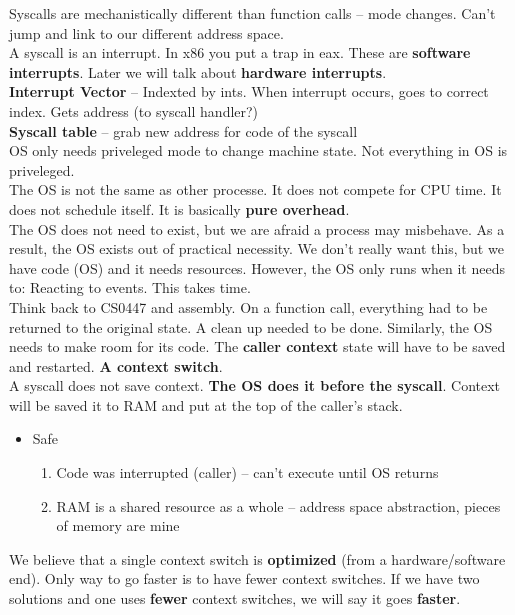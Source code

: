 \documentclass[../base_file/cs1550_notes.tex]{subfiles}
\begin{document}
Syscalls are mechanistically different than function calls -- mode changes.  Can't jump and link to our
different address space.\\

A syscall is an interrupt.  In x86 you put a trap in eax.  These are \textbf{software interrupts}. Later
we will talk about \textbf{hardware interrupts}.\\

\textbf{Interrupt Vector} -- Indexted by ints.  When interrupt occurs, goes to correct index.  Gets
address (to syscall handler?)\\

\textbf{Syscall table} -- grab new address for code of the syscall\\

OS only needs priveleged mode to change machine state.  Not everything in OS is priveleged.\\

The OS is not the same as other processe.  It does not compete for CPU time.  It does not schedule itself.
It is basically \textbf{pure overhead}.\\

The OS does not need to exist, but we are afraid a process may misbehave.  As a result, the OS exists out
of practical necessity.  We don't really want this, but we have code (OS) and it needs resources. However,
the OS only runs when it needs to: Reacting to events.  This takes time.\\

Think back to CS0447 and assembly.  On a function call, everything had to be returned to the original
state.  A clean up needed to be done.  Similarly, the OS needs to make room for its code.
The \textbf{caller context} state will have to be saved and restarted.  \textbf{A context switch}.\\

A syscall does not save context.  \textbf{The OS does it before the syscall}.  Context will be saved it
to RAM and put at the top of the caller's stack.
	\begin{itemize}
	\item Safe
		\begin{enumerate}
		\item Code was interrupted (caller) -- can't execute until OS returns
		\item RAM is a shared resource as a whole -- address space abstraction, pieces of memory are
			  mine
		\end{enumerate}
	\end{itemize}
We believe that a single context switch is \textbf{optimized}  (from a hardware/software end).  Only
way to go faster is to have fewer context switches. If we have two solutions and one uses \textbf{fewer}
context switches, we will say it goes \textbf{faster}.\\
\end{document}
